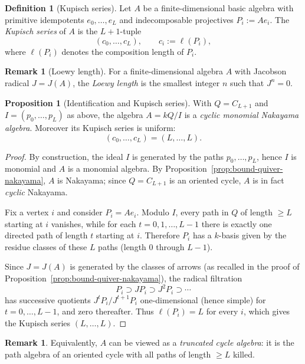 \documentclass{article}
\theoremstyle{definition}
\newtheorem{proposition}[theorem]{Proposition}
\newtheorem{definition}[theorem]{Definition}
\newtheorem{remark}[theorem]{Remark}
\begin{document}
\begin{definition}[Kupisch series]
Let $A$ be a finite-dimensional basic algebra with primitive idempotents $e_0,\ldots,e_{L}$ and indecomposable projectives
$P_i:=Ae_i$.
The \emph{Kupisch series} of $A$ is the $L+1$-tuple
\[
(c_0,\ldots,c_{L}),\qquad c_i:=\ell(P_i),
\]
where $\ell(P_i)$ denotes the composition length of $P_i$.
\end{definition}

\begin{remark}[Loewy length]
For a finite-dimensional algebra $A$ with Jacobson radical $J=J(A)$, the \emph{Loewy length} is the smallest integer $n$ such that $J^n=0$.
\end{remark}

\begin{proposition}[Identification and Kupisch series]
With $Q=C_{L+1}$ and $I=(p_0,\ldots,p_{L})$ as above, the algebra $A=kQ/I$ is a \emph{cyclic monomial Nakayama algebra}.
Moreover its Kupisch series is uniform:
\[
(c_0,\ldots,c_{L})=(L,\ldots,L).
\]
\end{proposition}

\begin{proof}
By construction, the ideal $I$ is generated by the paths $p_0,\ldots,p_{L}$, hence $I$ is monomial and $A$ is a monomial algebra.
By Proposition~\ref{prop:bound-quiver-nakayama}, $A$ is Nakayama; since $Q=C_{L+1}$ is an oriented cycle, $A$ is in fact \emph{cyclic} Nakayama.

Fix a vertex $i$ and consider $P_i=Ae_i$.
Modulo $I$, every path in $Q$ of length $\ge L$ starting at $i$ vanishes, while for each $t=0,1,\ldots,L-1$ there is exactly one directed path of length $t$ starting at $i$.
Therefore $P_i$ has a $k$-basis given by the residue classes of these $L$ paths (length $0$ through $L-1$).

Since $J=J(A)$ is generated by the classes of arrows (as recalled in the proof of Proposition~\ref{prop:bound-quiver-nakayama}), the radical filtration
\[
P_i \supset JP_i \supset J^2P_i \supset \cdots
\]
has successive quotients $J^tP_i/J^{t+1}P_i$ one-dimensional (hence simple) for $t=0,\ldots,L-1$, and zero thereafter.
Thus $\ell(P_i)=L$ for every $i$, which gives the Kupisch series $(L,\ldots,L)$.
\end{proof}

\begin{remark}
Equivalently, $A$ can be viewed as a \emph{truncated cycle algebra}: it is the path algebra of an oriented cycle with all paths of length $\ge L$ killed.
\end{remark}
\end{document}
